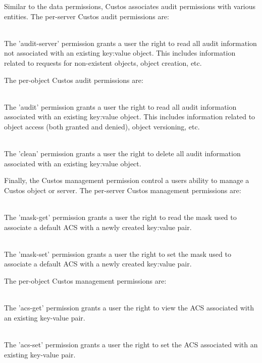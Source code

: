 Similar to the data permissions, Custos associates audit permissions
with various entities. The per-server Custos audit permissions are:

\begin{packed_desc}
\item[audit-server] \hfill \\ The 'audit-server' permission grants a
  user the right to read all audit information not associated with an
  existing key:value object. This includes information related to
  requests for non-existent objects, object creation, etc.
\end{packed_desc}

The per-object Custos audit permissions are:

\begin{packed_desc}
\item[audit] \hfill \\ The 'audit' permission grants a user the right
  to read all audit information associated with an existing key:value
  object. This includes information related to object access (both
  granted and denied), object versioning, etc.
\item[clean] \hfill \\ The 'clean' permission grants a user the right
  to delete all audit information associated with an existing key:value
  object.
\end{packed_desc}

Finally, the Custos management permission control a users ability to
manage a Custos object or server. The per-server Custos management
permissions are:

\begin{packed_desc}
\item[mask-get] \hfill \\ The 'mask-get' permission grants a user the
  right to read the mask used to associate a default ACS with a newly
  created key:value pair.
\item[mask-set] \hfill \\ The 'mask-set' permission grants a user the
  right to set the mask used to associate a default ACS with a newly
  created key:value pair.
\end{packed_desc}

The per-object Custos management permissions are:

\begin{packed_desc}
\item[acs-get] \hfill \\ The 'acs-get' permission grants a user the
  right to view the ACS associated with an existing key-value pair.
\item[acs-set] \hfill \\ The 'acs-set' permission grants a user the
  right to set the ACS associated with an existing key-value pair.
\end{packed_desc}

